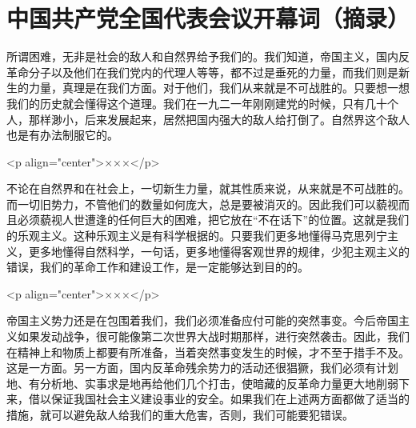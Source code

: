 \section[中国共产党全国代表会议开幕词（摘录）（一九五五年三月二十一日）]{中国共产党全国代表会议开幕词（摘录）}


所谓困难，无非是社会的敌人和自然界给予我们的。我们知道，帝国主义，国内反革命分子以及他们在我们党内的代理人等等，都不过是垂死的力量，而我们则是新生的力量，真理是在我们方面。对于他们，我们从来就是不可战胜的。只要想一想我们的历史就会懂得这个道理。我们在一九二一年刚刚建党的时候，只有几十个人，那样渺小，后来发展起来，居然把国内强大的敌人给打倒了。自然界这个敌人也是有办法制服它的。

<p align="center">×××</p>

不论在自然界和在社会上，一切新生力量，就其性质来说，从来就是不可战胜的。而一切旧势力，不管他们的数量如何庞大，总是要被消灭的。因此我们可以藐视而且必须藐视人世遭逢的任何巨大的困难，把它放在“不在话下”的位置。这就是我们的乐观主义。这种乐观主义是有科学根据的。只要我们更多地懂得马克思列宁主义，更多地懂得自然科学，一句话，更多地懂得客观世界的规律，少犯主观主义的错误，我们的革命工作和建设工作，是一定能够达到目的的。

<p align="center">×××</p>

帝国主义势力还是在包围着我们，我们必须准备应付可能的突然事变。今后帝国主义如果发动战争，很可能像第二次世界大战时期那样，进行突然袭击。因此，我们在精神上和物质上都要有所准备，当着突然事变发生的时候，才不至于措手不及。这是一方面。另一方面，国内反革命残余势力的活动还很猖獗，我们必须有计划地、有分析地、实事求是地再给他们几个打击，使暗藏的反革命力量更大地削弱下来，借以保证我国社会主义建设事业的安全。如果我们在上述两方面都做了适当的措施，就可以避免敌人给我们的重大危害，否则，我们可能要犯错误。


